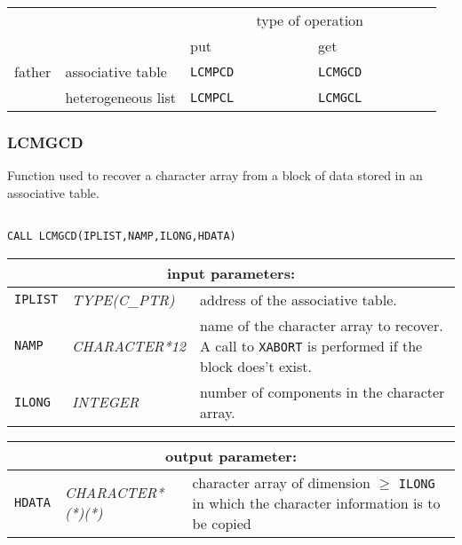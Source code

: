 \vskip 0.4cm

\begin{center}
\begin{tabular}{|c|l|l|l|}
\cline{3-4}
\multicolumn{2}{c|}{} & \multicolumn{2}{c|}{type of operation} \\
\cline{3-4}
\multicolumn{2}{c|}{} & put~~~~~~~~~~~~~ & get~~~~~~~~~~~~~ \\
\hline
father & associative table & {\tt LCMPCD} & {\tt LCMGCD} \\
\cline{2-4}
       & heterogeneous list & {\tt LCMPCL} & {\tt LCMGCL} \\
\hline
\end{tabular}
\end{center}

\subsubsection{LCMGCD}\label{sect:LCMGCD}

Function used to recover a character array from a block of data stored in an associative table.

\begin{verbatim}

CALL LCMGCD(IPLIST,NAMP,ILONG,HDATA)
\end{verbatim}

\noindent
\begin{tabular}{|p{1.5cm}|p{3cm}|p{10cm}|}
\hline
\multicolumn{3}{|c|}{\bf input parameters:} \\
\hline
{\tt IPLIST} & {\it TYPE(C\_PTR)} & address of the associative table. \\
\hline
{\tt NAMP} & {\it CHARACTER*12} &  name of the character array
to recover. A call to {\tt XABORT} is performed if the block does't exist. \\
\hline
{\tt ILONG} & {\it INTEGER} & number of components in the character array.\\
\hline
\end{tabular}

\vskip 0.8cm

\noindent
\begin{tabular}{|p{1.5cm}|p{3.5cm}|p{9.5cm}|}
\hline
\multicolumn{3}{|c|}{\bf output parameter:} \\
\hline
{\tt HDATA} & {\it CHARACTER*(*)(*)} & character array of dimension $\ge$ {\tt ILONG} in which the character information is to be copied \\
\hline
\end{tabular}

